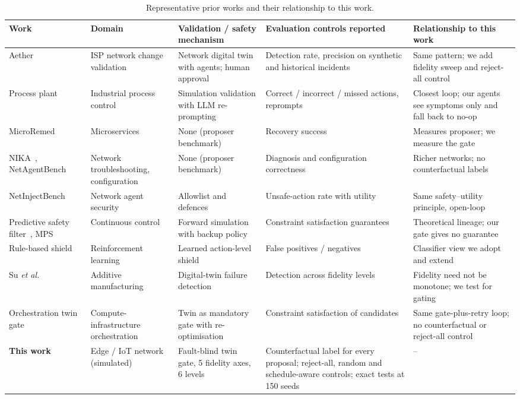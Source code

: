 \documentclass[conference]{IEEEtran}
\begin{document}
\begin{table}[t]
\centering
\caption{Representative prior works and their relationship to this work.}
\label{tab:related}
\small
\begin{tabularx}{\textwidth}{@{}p{2.6cm}p{2.5cm}YYY@{}}
\toprule
Work & Domain & Validation / safety mechanism & Evaluation controls reported & Relationship to this work \\
\midrule
Aether~\cite{aether} & ISP network change validation & Network digital twin with agents; human approval & Detection rate, precision on synthetic and historical incidents & Same pattern; we add fidelity sweep and reject-all control \\
Process plant~\cite{processplant} & Industrial process control & Simulation validation with LLM re-prompting & Correct / incorrect / missed actions, reprompts & Closest loop; our agents see symptoms only and fall back to no-op \\
MicroRemed~\cite{microremed} & Microservices & None (proposer benchmark) & Recovery success & Measures proposer; we measure the gate \\
NIKA~\cite{nika}, NetAgentBench~\cite{netagentbench} & Network troubleshooting, configuration & None (proposer benchmark) & Diagnosis and configuration correctness & Richer networks; no counterfactual labels \\
NetInjectBench~\cite{netinjectbench} & Network agent security & Allowlist and defences & Unsafe-action rate with utility & Same safety--utility principle, open-loop \\
Predictive safety filter~\cite{wabersich}, MPS~\cite{dmps} & Continuous control & Forward simulation with backup policy & Constraint satisfaction guarantees & Theoretical lineage; our gate gives no guarantee \\
Rule-based shield~\cite{rulebasedshield} & Reinforcement learning & Learned action-level shield & False positives / negatives & Classifier view we adopt and extend \\
Su \emph{et al.}~\cite{fidelityam} & Additive manufacturing & Digital-twin failure detection & Detection across fidelity levels & Fidelity need not be monotone; we test for gating \\
Orchestration twin gate~\cite{twingatedorch} & Compute-infrastructure orchestration & Twin as mandatory gate with re-optimisation & Constraint satisfaction of candidates & Same gate-plus-retry loop; no counterfactual or reject-all control \\
\textbf{This work} & Edge / IoT network (simulated) & Fault-blind twin gate, 5 fidelity axes, 6 levels & Counterfactual label for every proposal; reject-all, random and schedule-aware controls; exact tests at 150 seeds & -- \\
\bottomrule
\end{tabularx}
\end{table}
\end{document}
